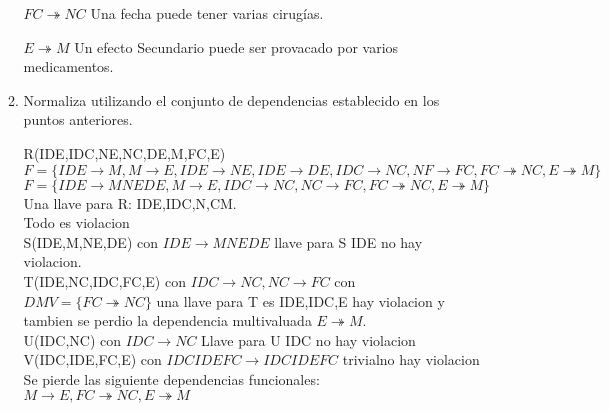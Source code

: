 \documentclass{article}
\begin{document}
\begin{enumerate}
\begin{enumerate}
        $FC \twoheadrightarrow NC$ Una fecha puede tener varias cirugías.

        $E \twoheadrightarrow M$ Un efecto Secundario puede ser provacado por
        varios medicamentos.

      \item Normaliza utilizando el conjunto de dependencias establecido en los
      puntos anteriores.
      
      R(IDE,IDC,NE,NC,DE,M,FC,E)\\
      $F=\{IDE \rightarrow M, M \rightarrow E, IDE \rightarrow NE , IDE \rightarrow DE, IDC \rightarrow NC ,NF \rightarrow FC , FC \twoheadrightarrow NC, E \twoheadrightarrow M\}$\\
      $F=\{IDE \rightarrow MNEDE, M \rightarrow E, IDC \rightarrow NC, NC \rightarrow FC, FC \twoheadrightarrow NC, E \twoheadrightarrow M\}$\\
      Una llave para R: IDE,IDC,N,CM.\\
      Todo es violacion\\
      S(IDE,M,NE,DE) con $IDE \rightarrow MNEDE$ llave para S IDE no hay violacion.\\
      T(IDE,NC,IDC,FC,E) con $IDC \rightarrow NC, NC\rightarrow FC$ con
      $DMV=\{FC \twoheadrightarrow NC\}$ una llave para T es IDE,IDC,E hay violacion y tambien se perdio la dependencia multivaluada $E \twoheadrightarrow M$.\\
      U(IDC,NC) con $IDC \rightarrow NC$ Llave para U IDC no hay violacion\\
      V(IDC,IDE,FC,E) con $IDCIDEFC \rightarrow IDCIDEFC$ trivialno hay violacion\\
      Se pierde las siguiente dependencias funcionales: \\
      $M \rightarrow E, FC \twoheadrightarrow NC, E \twoheadrightarrow M$\\
    \end{enumerate}
  \end{enumerate}
\end{document}
